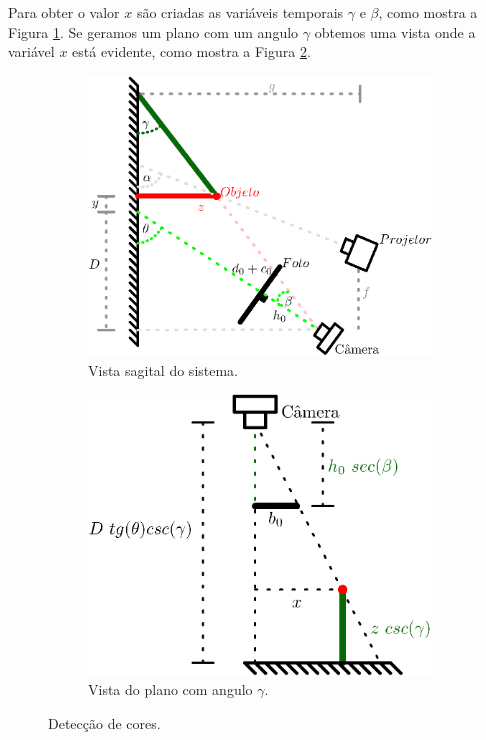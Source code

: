 \documentclass[12pt]{article}
\begin{document}
Para obter o valor $x$ são criadas as variáveis temporais $\gamma$ e $\beta$, como mostra 
a Figura \ref{fig:blocos2:sagital}.
Se geramos um plano com um angulo $\gamma$
obtemos uma vista onde a variável $x$ está evidente, como mostra a Figura \ref{fig:blocos2:plano}.
\begin{figure}[!h]
     \centering
     \begin{subfigure}[b]{0.475\textwidth}
         \centering
         \includegraphics[width=\textwidth]{Diagrama5.eps}
         \caption{Vista sagital do sistema.}
         \label{fig:blocos2:sagital}
     \end{subfigure}
     \hfill
     \begin{subfigure}[b]{0.475\textwidth}
         \centering
         \includegraphics[width=\textwidth]{Diagrama4.eps}
         \caption{Vista do plano com angulo $\gamma$.}
         \label{fig:blocos2:plano}
     \end{subfigure}
\caption{Detecção de cores.}
\label{fig:blocos2}
\end{figure}
\end{document}
